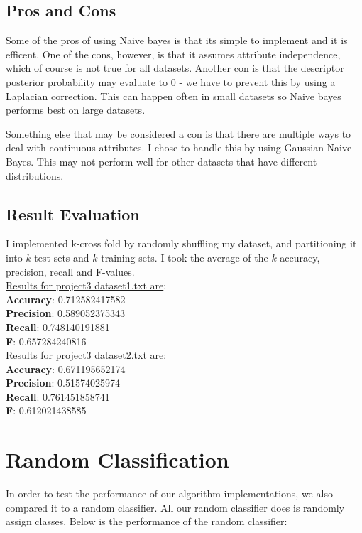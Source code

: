 \documentclass[paper=letter, fontsize=11pt]{article}
\numberwithin{equation}{section}		%
\numberwithin{figure}{section}			%
\numberwithin{table}{section}				%
\begin{document}
\subsection{Pros and Cons}
Some of the pros of using Naive bayes is that its simple to implement and it is efficent. One of the cons, however, is that it assumes attribute independence, which of course is not true for all datasets. Another con is that the descriptor posterior probability may evaluate to 0 - we have to prevent this by using a Laplacian correction. This can happen often in small datasets so Naive bayes performs best on large datasets. 

\noindent Something else that may be considered a con is that there are multiple ways to deal with continuous attributes. I chose to handle this by using Gaussian Naive Bayes. This may not perform well for other datasets that have different distributions. 

\subsection{Result Evaluation}
I implemented k-cross fold by randomly shuffling my dataset, and partitioning it into $k$ test sets and $k$ training sets. I took the average of the $k$ accuracy, precision, recall and F-values. \\

\noindent \underline{Results for project3 dataset1.txt are}: \\ 
\textbf{Accuracy}: 0.712582417582\\
\textbf{Precision}: 0.589052375343\\
\textbf{Recall}: 0.748140191881\\
\textbf{F}: 0.657284240816\\

\noindent \underline{Results for project3 dataset2.txt are}:\\
\textbf{Accuracy}: 0.671195652174\\
\textbf{Precision}: 0.51574025974\\
\textbf{Recall}: 0.761451858741\\
\textbf{F}: 0.612021438585\\

\section{Random Classification}
In order to test the performance of our algorithm implementations, we also compared it to a random classifier. All our random classifier does is randomly assign classes. Below is the performance of the random classifier: \\
\end{document}
